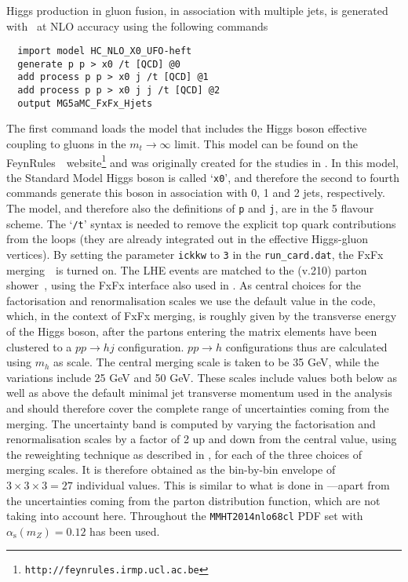 \subsubsection{\MGaMC}
\label{sec:hjetscomp:tools:mc:mgamc}

Higgs production in gluon fusion, in association with multiple jets,
is generated with \MGaMC \cite{Alwall:2014hca}~at NLO
accuracy using the following commands
\begin{verbatim}
  import model HC_NLO_X0_UFO-heft
  generate p p > x0 /t [QCD] @0
  add process p p > x0 j /t [QCD] @1
  add process p p > x0 j j /t [QCD] @2
  output MG5aMC_FxFx_Hjets
\end{verbatim}
The first command loads the model that includes the Higgs boson
effective coupling to gluons in the $m_t\to\infty$ limit. This model
can be found on the
FeynRules~\cite{Alloul:2013bka}~website\footnote{\texttt{http://feynrules.irmp.ucl.ac.be}}
and was originally created for the studies in
\cite{Demartin:2014fia}. In this model, the Standard Model Higgs
boson is called `\texttt{x0}', and therefore the second to fourth
commands generate this boson in association with 0, 1 and 2 jets,
respectively. The model, and therefore also the definitions of
\texttt{p} and \texttt{j}, are in the 5 flavour scheme. The
`\texttt{/t}' syntax is needed to remove the explicit top quark
contributions from the loops (they are already integrated out in the
effective Higgs-gluon vertices). By setting the parameter
\texttt{ickkw} to \texttt{3} in the \texttt{run\_card.dat}, the FxFx
merging~\cite{Frederix:2012ps}~is turned on. The LHE events are
matched to the  (v.210) parton
shower~\cite{Sjostrand:2014zea}, using the FxFx interface also used in
\cite{Frederix:2015eii}. As central choices for the factorisation
and renormalisation scales we use the default value in the
\MGaMC code, which, in the context of FxFx merging, is
roughly given by the transverse energy of the Higgs boson, after the
partons entering the matrix elements have been clustered to a $pp \to h
j$ configuration. $pp\to h$ configurations thus are calculated using 
$m_h$ as scale. The central merging scale is taken to be 35 GeV,
while the variations include 25 GeV and 50 GeV. These scales include 
values both below as well as above the default minimal jet transverse
momentum used in the analysis and should therefore cover the complete
range of uncertainties coming from the merging.  The uncertainty band
is computed by varying the factorisation and renormalisation scales by
a factor of 2 up and down from the central value, using the reweighting
technique as described in \cite{Frederix:2011ss}, for each of the
three choices of merging scales. It is therefore obtained
as the bin-by-bin envelope of $3 \times 3 \times 3 = 27$ individual
values. This is similar to what is done in
\cite{Frederix:2015eii}---apart from the uncertainties coming
from the parton distribution function, which are not taking into
account here. Throughout the \texttt{MMHT2014nlo68cl} PDF set with 
$\alpha_\mathrm{s}(m_Z)=0.12$ has been used.
